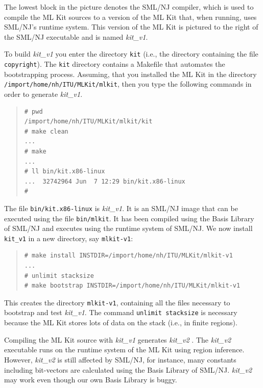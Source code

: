 \documentclass[12pt]{book}
\begin{document}
The lowest block in the picture denotes the SML/NJ compiler, which is
used to compile the ML Kit sources to a version of the ML Kit that,
when running, uses SML/NJ's runtime system. This version of the ML Kit
is pictured to the right of the SML/NJ executable and is named
\emph{kit\_v1}.

To build \emph{kit\_v1}  you enter the directory \texttt{kit} (i.e.,
the directory containing the file \texttt{copyright}). The
\texttt{kit} directory contains a Makefile that automates the
bootstrapping process.  Assuming, that you installed the ML Kit in the
directory \texttt{/import/home/nh/ITU/MLKit/mlkit}, then you type the
following commands in order to generate \emph{kit\_v1}.

\begin{small}
\begin{quote}
\begin{verbatim}
# pwd
/import/home/nh/ITU/MLKit/mlkit/kit
# make clean
...
# make
...
# ll bin/kit.x86-linux 
...  32742964 Jun  7 12:29 bin/kit.x86-linux
# 
\end{verbatim}
\end{quote}
\end{small}

The file \texttt{bin/kit.x86-linux} is \emph{kit\_v1}. It is an SML/NJ
image that can be executed using the file \texttt{bin/mlkit}. It has
been compiled using the Basis Library of SML/NJ and executes using the
runtime system of SML/NJ. We now install \texttt{kit\_v1} in a new
directory, say \texttt{mlkit-v1}:

\begin{small}
\begin{quote}
\begin{verbatim}
# make install INSTDIR=/import/home/nh/ITU/MLKit/mlkit-v1
...
# unlimit stacksize
# make bootstrap INSTDIR=/import/home/nh/ITU/MLKit/mlkit-v1
\end{verbatim}
\end{quote}
\end{small}

This creates the directory \texttt{mlkit-v1}, containing all the files
necessary to bootstrap and test \emph{kit\_v1}. The command \texttt{unlimit
  stacksize} is necessary because the ML Kit stores lots of data on
the stack (i.e., in finite regions).

Compiling the ML Kit source with \emph{kit\_v1} generates
\emph{kit\_v2} . The \emph{kit\_v2}
executable runs on the runtime system of the ML Kit using region
inference. However, \emph{kit\_v2} is still affected by SML/NJ, for
instance, many constants including bit-vectors are calculated using
the Basis Library of SML/NJ.  \emph{kit\_v2} may work even though our
own Basis Library is buggy.
\end{document}
